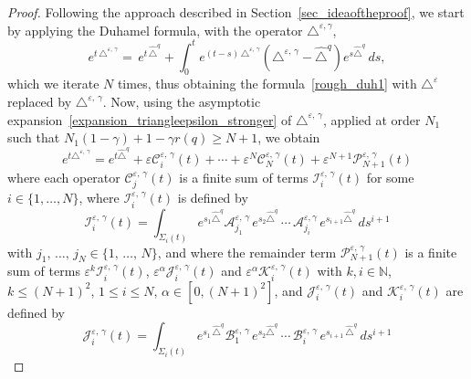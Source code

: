 \documentclass[AHL,Unicode,published]{cedram}
\newcommand*\N{\mathbb{N}}
\newcommand{\calK}{\mathcal{K}}
\newcommand{\calA}{\mathcal{A}}
\newcommand{\calC}{\mathcal{C}}
\newcommand{\calI}{\mathcal{I}}
\newcommand{\calP}{\mathcal{P}}
\newcommand{\calJ}{\mathcal{J}}
\newcommand{\calB}{\mathcal{B}}
\renewcommand{\geq}{\geqslant}
\renewcommand{\leq}{\leqslant}
\begin{document}
\begin{proof}
Following the approach described in Section~\ref{sec_ideaoftheproof}, we start by applying the Duhamel formula, with the operator $\triangle^{\varepsilon,\gamma}$,
\[
e^{t\,\triangle^{\varepsilon,\,\gamma}} =\, e^{t \,\widehat{\triangle}^{q}} + \int_0^t e^{(t-s)\,\triangle^{\varepsilon,\,\gamma}} \left(\triangle^{\varepsilon,\,\gamma} - \widehat{\triangle}^{q}\right) e^{s \widehat{\triangle}^{q}}\, ds,
\]
which we iterate $N$ times, thus obtaining the formula~\eqref{rough_duh1} with $\triangle^\varepsilon$ replaced by $\triangle^{\varepsilon,\,\gamma}$. Now, using the asymptotic expansion~\eqref{expansion_triangleepsilon_stronger} of $\triangle^{\varepsilon,\,\gamma}$, applied at order $N_1$ such that $N_1(1-\gamma)+1-\gamma r(q)\geq N+1$, we obtain
\begin{equation}\label{expansion_exp_triangle_epsgam}
e^{t\triangle^{\varepsilon,\,\gamma}} = e^{t \widehat{\triangle}^{q}} + \varepsilon \calC_i^{\varepsilon,\,\gamma}(t) + \cdots + \varepsilon^N \calC_N^{\varepsilon,\,\gamma}(t) + \varepsilon^{N+1} \calP_{N+1}^{\varepsilon,\,\gamma}(t)
\end{equation}
where each operator $\calC_j^{\varepsilon,\,\gamma}(t)$ is a finite sum of terms $\calI_i^{\varepsilon,\,\gamma}(t)$ for some $i\in\{1,\ldots,N\}$, where $\calI_i^{\varepsilon,\,\gamma}(t)$ is defined by
\begin{equation}\label{def_mathcal_Ii_epsgam}
\calI_i^{\varepsilon,\,\gamma}(t) = \int_{\Sigma_i(t)} e^{s_1 \widehat{\triangle}^{q}} \calA_{j_1}^{\varepsilon,\,\gamma} \, e^{s_2 \widehat{\triangle}^{q}}\,\cdots\,\calA_{j_i}^{\varepsilon,\gamma} \, e^{s_{i+1} \widehat{\triangle}^{q}} \, ds^{i+1}
\end{equation}
with $j_1,\,\ldots,\,j_N\in\{1,\,\ldots,\,N\}$, and where the remainder term $\calP_{N+1}^{\varepsilon,\,\gamma}(t)$ is a finite sum of terms $\varepsilon^k\calI_i^{\varepsilon,\,\gamma}(t)$, $\varepsilon^\alpha\calJ_i^{\varepsilon,\,\gamma}(t)$ and $\varepsilon^\alpha\calK_i^{\varepsilon,\,\gamma}(t)$ with $k,i\in\N$, $k\leq (N+1)^2$, $1\leq i\leq N$, $\alpha\in[0,(N+1)^2]$, and $\calJ_i^{\varepsilon,\,\gamma}(t)$ and $\calK_i^{\varepsilon,\,\gamma}(t)$ are defined by
\begin{equation}\label{def_mathcal_Jiepsgam}
\calJ_i^{\varepsilon,\,\gamma}(t) = \int_{\Sigma_i(t)} e^{s_1\, \widehat{\triangle}^{q}} \calB_{1}^{\varepsilon,\,\gamma} \, e^{s_2 \widehat{\triangle}^{q}}\,\cdots\,\calB_i^{\varepsilon,\,\gamma} \, e^{s_{i+1}\,\widehat{\triangle}^{q}} \, ds^{i+1}

\end{equation}
\end{proof}
\end{document}
